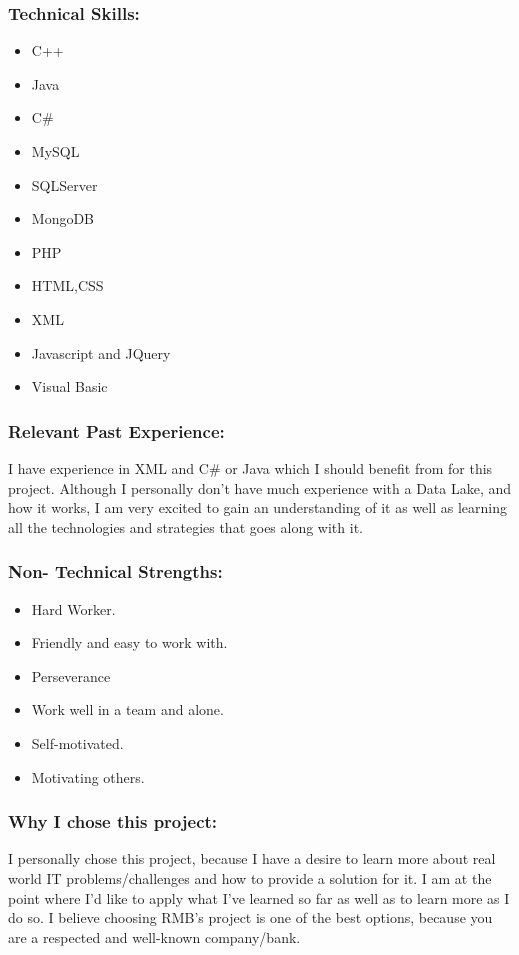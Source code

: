 \subsubsection{Technical Skills:}
	\begin{itemize}
		\item C++
		\item Java
		\item	C\#
		\item	MySQL
		\item	SQLServer
		\item	MongoDB
		\item PHP
		\item HTML,CSS
		\item XML
		\item Javascript and JQuery
		\item Visual Basic 
	\end{itemize}

\subsubsection{Relevant Past Experience:}
	\par{I have experience in XML and C\# or Java which I should benefit from for this project. Although I personally don't have much experience with a Data Lake, and how it works, I am very excited to gain an understanding of it as well as learning all the technologies and strategies that goes along with it.}

\subsubsection{Non- Technical Strengths:}
	\begin{itemize}
		\item Hard Worker.
		\item Friendly and easy to work with.
		\item Perseverance
		\item Work well in a team and alone.
		\item Self-motivated.
		\item Motivating others.
	\end{itemize}

\subsubsection{Why I chose this project:}
	\par{I personally chose this project, because I have a desire to learn more about real world IT problems/challenges and how to provide a solution for it. I am at the point where I'd like to apply what I've learned so far as well as to learn more as I do so. I believe choosing RMB's project is one of the best options, because you are a respected and well-known company/bank.}

